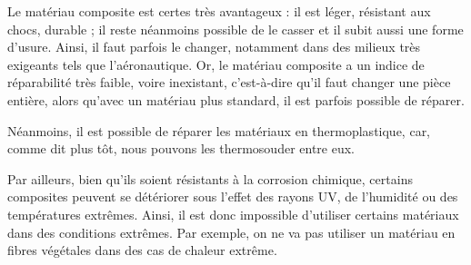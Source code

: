 Le matériau composite est certes très avantageux : il est léger, résistant aux chocs, durable ; il reste néanmoins possible de le casser et il subit aussi une forme d’usure.
Ainsi, il faut parfois le changer, notamment dans des milieux très exigeants tels que l’aéronautique.
Or, le matériau composite a un indice de réparabilité très faible, voire inexistant, c’est-à-dire qu’il faut changer une pièce entière, alors qu’avec un matériau plus standard, il est parfois possible de réparer.


Néanmoins, il est possible de réparer les matériaux en thermoplastique, car, comme dit plus tôt, nous pouvons les thermosouder entre eux.


Par ailleurs, bien qu'ils soient résistants à la corrosion chimique, certains composites peuvent se détériorer sous l'effet des rayons UV, de l'humidité ou des températures extrêmes.
Ainsi, il est donc impossible d’utiliser certains matériaux dans des conditions extrêmes. Par exemple, on ne va pas utiliser un matériau en fibres végétales dans des cas de chaleur extrême.



